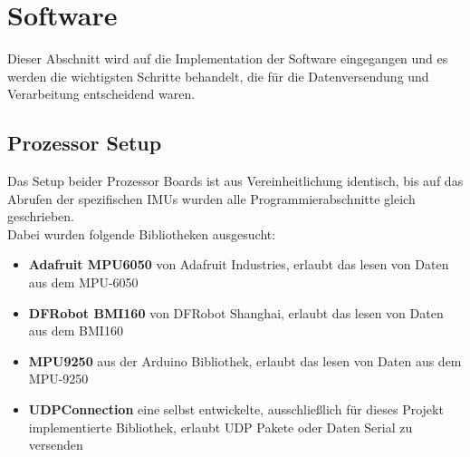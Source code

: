 \chapter{Software}
Dieser Abschnitt wird auf die Implementation der Software eingegangen und es werden die wichtigsten Schritte behandelt, die für die Datenversendung und Verarbeitung entscheidend waren.
\section{Prozessor Setup}

Das Setup beider Prozessor Boards ist aus Vereinheitlichung identisch, bis auf das Abrufen der spezifischen IMUs wurden alle Programmierabschnitte gleich geschrieben. 
\\
Dabei wurden folgende Bibliotheken ausgesucht:
\begin{itemize}
    \item \textbf{Adafruit MPU6050} von Adafruit Industries, erlaubt das lesen von Daten aus dem MPU-6050\parencite{web:Adafruit}
    \item \textbf{DFRobot BMI160} von DFRobot Shanghai, erlaubt das lesen von Daten aus dem BMI160 \parencite{web:DFRobot}
    \item \textbf{MPU9250} aus der Arduino Bibliothek, erlaubt das lesen von Daten aus dem MPU-9250
    \item \textbf{UDPConnection} eine selbst entwickelte, ausschließlich für dieses Projekt implementierte Bibliothek, erlaubt UDP Pakete oder Daten Serial zu versenden 
\end{itemize}

